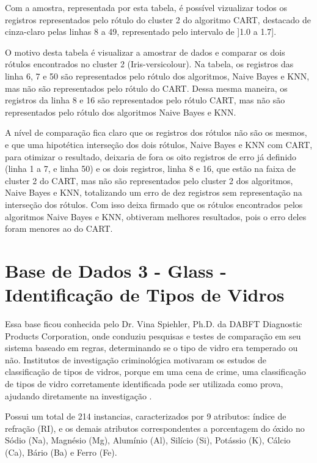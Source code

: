 Com a amostra, representada por esta tabela, é possível vizualizar todos os registros representados pelo rótulo do cluster 2 do algoritmo CART, destacado de cinza-claro pelas linhas 8 a 49, representado pelo intervalo de ]1.0 a 1.7].

O motivo desta tabela é visualizar  a amostrar de dados e comparar os dois rótulos encontrados no cluster 2 (Iris-versicolour). Na tabela, os registros das linha 6, 7 e 50 são representados pelo rótulo dos algoritmos, Naive Bayes e KNN, mas não são representados pelo rótulo do CART. Dessa mesma maneira, os registros da linha 8 e 16 são representados pelo rótulo CART, mas não são representados pelo rótulo dos algoritmos Naive Bayes e KNN. 

A nível de comparação fica claro que os registros dos rótulos não são os mesmos, e que uma hipotética interseção dos dois rótulos, Naive Bayes e KNN com CART, para otimizar o resultado, deixaria de fora os oito registros de erro já definido (linha 1 a 7, e linha 50) e os dois registros, linha 8 e 16, que estão na faixa de cluster 2 do CART, mas não são representados pelo cluster 2 dos algoritmos, Naive Bayes e KNN, totalizando um erro de dez registros sem representação na interseção dos rótulos. Com isso deixa firmado que os rótulos encontrados pelos algoritmos Naive Bayes e KNN, obtiveram melhores resultados, pois o erro deles foram menores ao do CART.

\section{Base de Dados 3 - Glass - Identificação de Tipos de Vidros}\label{cap:resultados:ssec:iris}

Essa base ficou conhecida pelo Dr. Vina Spiehler, Ph.D. da DABFT Diagnostic Products Corporation, onde conduziu pesquisas e testes de comparação em seu sistema baseado em regras, determinando se o tipo de vidro era temperado ou não. Institutos de investigação criminológica motivaram os estudos de classificação de tipos de vidros, porque em uma cena de crime, uma classificação de tipos de vidro corretamente identificada pode ser utilizada como prova, ajudando diretamente na investigação \cite{Evett:1989}.

Possui um total de 214 instancias, caracterizados por 9 atributos: índice de refração (RI), e os demais atributos correspondentes a porcentagem do óxido no Sódio (Na), Magnésio (Mg), Alumínio (Al), Silício (Si), Potássio (K), Cálcio (Ca), Bário (Ba) e Ferro (Fe).


